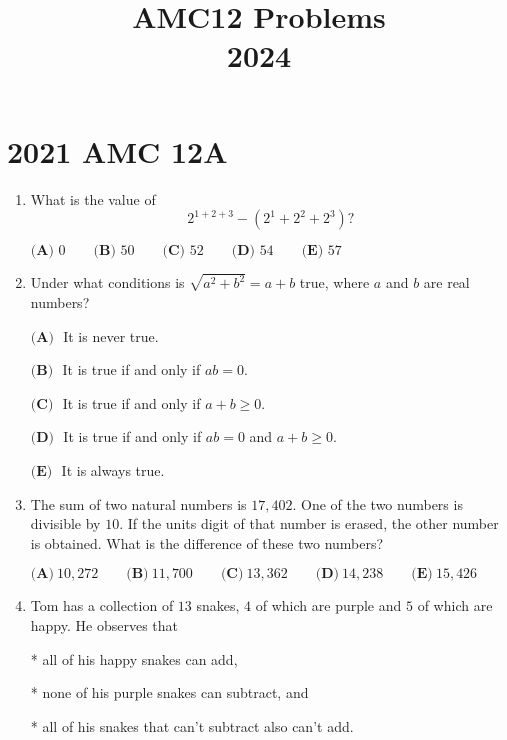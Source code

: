 \documentclass{article}
\title{AMC12 Problems \\ 2024}
\date{}
\begin{document}
\maketitle\thispagestyle{fancy}\newpage\section*{2021 AMC 12A}\begin{enumerate}[label=\arabic*., itemsep=0.5em]\item What is the value of
\begin{equation*}
2^{1+2+3}-(2^1+2^2+2^3)?
\end{equation*}

\(\textbf{(A) }0 \qquad \textbf{(B) }50 \qquad \textbf{(C) }52 \qquad \textbf{(D) }54 \qquad \textbf{(E) }57\)\par \vspace{0.5em}\item Under what conditions is \(\sqrt{a^2+b^2}=a+b\) true, where \(a\) and \(b\) are real numbers?

\(\textbf{(A) }\) It is never true.

\(\textbf{(B) }\) It is true if and only if \(ab=0\).

\(\textbf{(C) }\) It is true if and only if \(a+b\ge 0\).

\(\textbf{(D) }\) It is true if and only if \(ab=0\) and \(a+b\ge 0\).

\(\textbf{(E) }\) It is always true.\par \vspace{0.5em}\item The sum of two natural numbers is \(17{,}402\). One of the two numbers is divisible by \(10\). If the units digit of that number is erased, the other number is obtained. What is the difference of these two numbers?

\(\textbf{(A)} ~10{,}272\qquad\textbf{(B)} ~11{,}700\qquad\textbf{(C)} ~13{,}362\qquad\textbf{(D)} ~14{,}238\qquad\textbf{(E)} ~15{,}426\)\par \vspace{0.5em}\item Tom has a collection of \(13\) snakes, \(4\) of which are purple and \(5\) of which are happy. He observes that

* all of his happy snakes can add,

* none of his purple snakes can subtract, and

* all of his snakes that can't subtract also can't add.


\end{enumerate}
\end{document}
